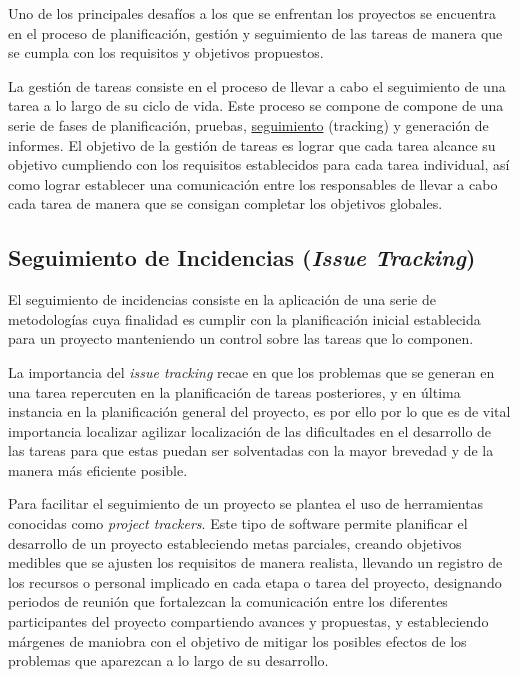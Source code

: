 Uno de los principales desafíos a los que se enfrentan los proyectos se encuentra en el proceso de planificación, gestión y seguimiento de las tareas de manera que se cumpla con los requisitos y objetivos propuestos.  \cite{ct:universal_knowledge_management}

La gestión de tareas consiste en el proceso de llevar a cabo el seguimiento de una tarea a lo largo de su ciclo de vida. Este proceso se compone de compone de una serie de fases de planificación, pruebas, \hyperref[sec:seguimientoincidencias]{seguimiento} (tracking) y generación de informes. El objetivo de la gestión de tareas es lograr que cada tarea alcance su objetivo cumpliendo con los requisitos establecidos para cada tarea individual, así como lograr establecer una comunicación entre los responsables de llevar a cabo cada tarea de manera que se consigan completar los objetivos globales.

\subsection{Seguimiento de Incidencias (\emph{Issue Tracking})} \label{sec:seguimientoincidencias}

El seguimiento de incidencias consiste en la aplicación de una serie de metodologías cuya finalidad es cumplir con la planificación inicial establecida para un proyecto manteniendo un control sobre las tareas que lo componen.

La importancia del \emph{issue tracking} recae en que los problemas que se generan en una tarea repercuten en la planificación de tareas posteriores, y en última instancia en la planificación general del proyecto, es por ello por lo que es de vital importancia localizar agilizar localización de las dificultades en el desarrollo de las tareas para que estas puedan ser solventadas con la mayor brevedad y de la manera más eficiente posible.

Para facilitar el seguimiento de un proyecto se plantea el uso de herramientas conocidas como \emph{project trackers}. Este tipo de software permite planificar el desarrollo de un proyecto estableciendo metas parciales, creando objetivos medibles que se ajusten los requisitos de manera realista, llevando un registro de los recursos o personal implicado en cada etapa o tarea del proyecto, designando periodos de reunión que fortalezcan la comunicación entre los diferentes participantes del proyecto compartiendo avances y propuestas, y estableciendo márgenes de maniobra con el objetivo de mitigar los posibles efectos de los problemas que aparezcan a lo largo de su desarrollo.

